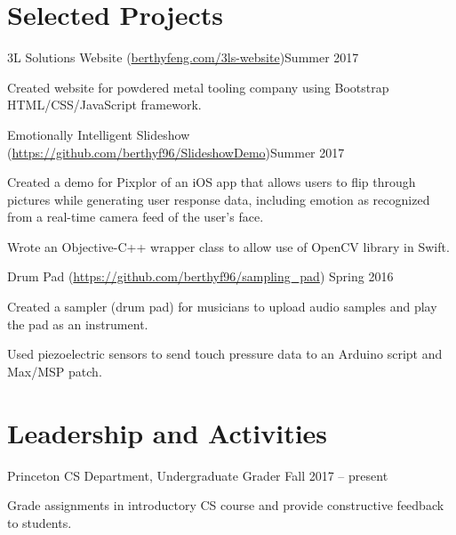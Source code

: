 \documentclass[12pt]{my_resume}
\begin{document}
\section{Selected Projects}

\begin{resitem}{3L Solutions Website %
(\url{berthyfeng.com/3ls-website})}{Summer 2017}
  \item Created website for powdered metal tooling company using %
  Bootstrap HTML/CSS/JavaScript framework.
\end{resitem}

\vspace{-8pt}

\begin{resitem}{Emotionally Intelligent Slideshow %
(\url{https://github.com/berthyf96/SlideshowDemo})}{Summer 2017}
  \item Created a demo for Pixplor of an iOS app that allows users to %
  flip through pictures while generating user response data, including %
  emotion as recognized from a real-time camera feed of the user’s face.
  \item Wrote an Objective-C++ wrapper class to allow use of OpenCV %
  library in Swift.
\end{resitem}

\vspace{-8pt}

\begin{resitem}{Drum Pad (\url{https://github.com/berthyf96/sampling_pad})}%
{Spring 2016}
  \item Created a sampler (drum pad) for musicians to upload audio %
  samples and play the pad as an instrument.
  \item Used piezoelectric sensors to send touch pressure data to an %
  Arduino script and Max/MSP patch.
\end{resitem}

\section{Leadership and Activities}

\begin{resitem}{Princeton CS Department, Undergraduate Grader}%
{Fall 2017 -- present}
  \item Grade assignments in introductory CS course and %
  provide constructive feedback to students.
\end{resitem}
\end{document}
